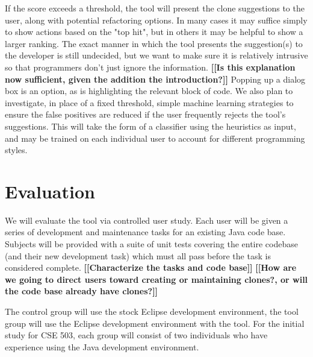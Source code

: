 \documentclass[preprint,10pt]{sigplanconf}
\newcommand{\todo}[1]{{\bfseries [[#1]]}}
\begin{document}
If the score exceeds a threshold, the tool will present the 
clone suggestions to the user, along with potential refactoring options.  
In many cases it may suffice simply to show actions based on the "top hit", but in others 
it may be helpful to show a larger ranking. The exact manner in which the tool
presents the suggestion(s) to the developer is still undecided, but we want to make sure it is
relatively intrusive so that programmers don't just ignore the
information. 
\todo{Is this explanation now sufficient, given the addition the introduction?}
Popping up a dialog box is an option, as is highlighting
the relevant block of code. We also plan to investigate, in place of a
fixed threshold, simple machine learning strategies to ensure the
false positives are reduced if the user frequently rejects the tool's
suggestions.  This will take the form of a classifier using the
heuristics as input, and may be trained on each individual user to
account for different programming styles.

\section{Evaluation}


We will evaluate the tool via controlled user study. Each user will be given
a series of development and maintenance tasks for an existing Java
code base. Subjects will be provided with a suite of unit tests covering the
entire codebase (and their new development task) which must all pass
before the task is considered complete.
\todo{Characterize the tasks and code base} 
\todo{How are we going to direct users toward creating or maintaining
  clones?, or will the code base already have clones?}

The control group will use the stock Eclipse development
environment, the tool group will use the Eclipse development
environment with the tool. For the initial study for CSE 503, each
group will consist of two individuals who have experience using the
Java development environment.  
\end{document}
